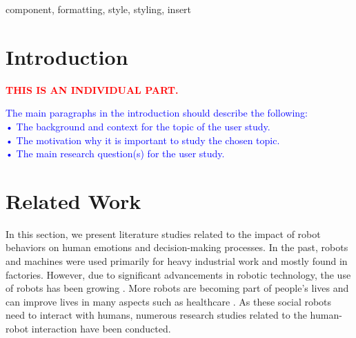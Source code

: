 \documentclass[conference]{IEEEtran}
\begin{document}
\begin{IEEEkeywords}
component, formatting, style, styling, insert
\end{IEEEkeywords}

\section{Introduction}

\textcolor{red}{\textbf{THIS IS AN INDIVIDUAL PART.}}

\textcolor{blue}{
The main paragraphs in the introduction should describe the following:\\
• The background and context for the topic of the user study.\\
• The motivation why it is important to study the chosen topic.\\
• The main research question(s) for the user study.\\}


\section{Related Work}



In this section, we present literature studies related to the impact of robot behaviors on human emotions and decision-making processes. In the past, robots and machines were used primarily for heavy industrial work and mostly found in factories. However, due to significant advancements in robotic technology, the use of robots has been growing \cite{horstmann_robots_2018}. More robots are becoming part of people's lives and can improve lives in many aspects such as healthcare \cite{olaronke_state_2017}. As these social robots need to interact with humans, numerous research studies related to the human-robot interaction have been conducted.
\end{document}
